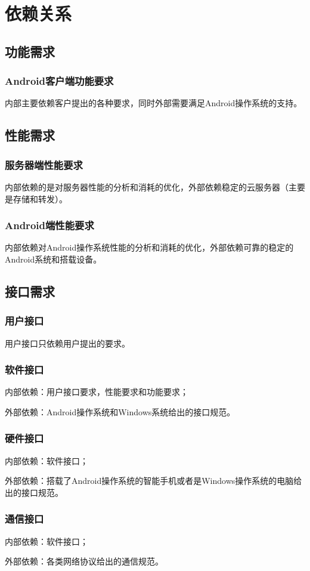 \chapter{依赖关系}


\section{功能需求}
\subsection{Android客户端功能要求}
内部主要依赖客户提出的各种要求，同时外部需要满足Android操作系统的支持。

\section{性能需求}
\subsection{服务器端性能要求}
内部依赖的是对服务器性能的分析和消耗的优化，外部依赖稳定的云服务器（主要是存储和转发）。
\subsection{Android端性能要求}
内部依赖对Android操作系统性能的分析和消耗的优化，外部依赖可靠的稳定的Android系统和搭载设备。

\section{接口需求}
\subsection{用户接口}
用户接口只依赖用户提出的要求。
\subsection{软件接口}
内部依赖：用户接口要求，性能要求和功能要求；

外部依赖：Android操作系统和Windows系统给出的接口规范。
\subsection{硬件接口}
内部依赖：软件接口；

外部依赖：搭载了Android操作系统的智能手机或者是Windows操作系统的电脑给出的接口规范。
\subsection{通信接口}
内部依赖：软件接口；

外部依赖：各类网络协议给出的通信规范。